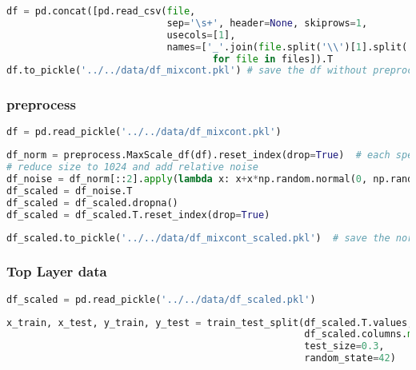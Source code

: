 \begin{lstlisting}[language=Python]
df = pd.concat([pd.read_csv(file,
                            sep='\s+', header=None, skiprows=1,
                            usecols=[1],
                            names=['_'.join(file.split('\\')[1].split('_')[:-1])]).T 
                                    for file in files]).T
df.to_pickle('../../data/df_mixcont.pkl') # save the df without preprocessing
\end{lstlisting}

\hypertarget{preprocess}{%
\subsubsection{preprocess}\label{preprocess}}

\begin{lstlisting}[language=Python]
df = pd.read_pickle('../../data/df_mixcont.pkl') 
\end{lstlisting}

\begin{lstlisting}[language=Python]
df_norm = preprocess.MaxScale_df(df).reset_index(drop=True)  # each spectrum is scaled to 1
# reduce size to 1024 and add relative noise
df_noise = df_norm[::2].apply(lambda x: x+x*np.random.normal(0, np.random.randint(1,3)*0.01 , len(x)))
df_scaled = df_noise.T
df_scaled = df_scaled.dropna()
df_scaled = df_scaled.T.reset_index(drop=True)
\end{lstlisting}

\begin{lstlisting}[language=Python]
df_scaled.to_pickle('../../data/df_mixcont_scaled.pkl')  # save the normalized, scaled df
\end{lstlisting}

\hypertarget{top-layer-data}{%
\subsubsection{Top Layer data}\label{top-layer-data}}

\begin{lstlisting}[language=Python]
df_scaled = pd.read_pickle('../../data/df_scaled.pkl')
\end{lstlisting}

\begin{lstlisting}[language=Python]
x_train, x_test, y_train, y_test = train_test_split(df_scaled.T.values,
                                                    df_scaled.columns.map(lambda x: x.split('_')[0]), # first part of the filename is the top label
                                                    test_size=0.3,
                                                    random_state=42)
\end{lstlisting}

